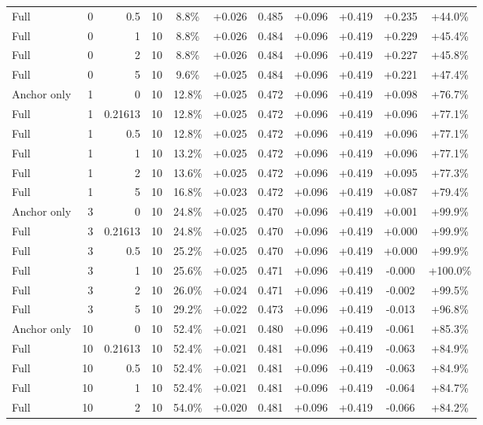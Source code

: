 \begin{table}[htbp]
\begin{tabular}{lrrrccccccc}
Full & 0 & 0.5 & 10 & 8.8\% & +0.026 & 0.485 & +0.096 & +0.419 & +0.235 & +44.0\% \\
Full & 0 & 1 & 10 & 8.8\% & +0.026 & 0.484 & +0.096 & +0.419 & +0.229 & +45.4\% \\
Full & 0 & 2 & 10 & 8.8\% & +0.026 & 0.484 & +0.096 & +0.419 & +0.227 & +45.8\% \\
Full & 0 & 5 & 10 & 9.6\% & +0.025 & 0.484 & +0.096 & +0.419 & +0.221 & +47.4\% \\
Anchor only & 1 & 0 & 10 & 12.8\% & +0.025 & 0.472 & +0.096 & +0.419 & +0.098 & +76.7\% \\
Full & 1 & 0.21613 & 10 & 12.8\% & +0.025 & 0.472 & +0.096 & +0.419 & +0.096 & +77.1\% \\
Full & 1 & 0.5 & 10 & 12.8\% & +0.025 & 0.472 & +0.096 & +0.419 & +0.096 & +77.1\% \\
Full & 1 & 1 & 10 & 13.2\% & +0.025 & 0.472 & +0.096 & +0.419 & +0.096 & +77.1\% \\
Full & 1 & 2 & 10 & 13.6\% & +0.025 & 0.472 & +0.096 & +0.419 & +0.095 & +77.3\% \\
Full & 1 & 5 & 10 & 16.8\% & +0.023 & 0.472 & +0.096 & +0.419 & +0.087 & +79.4\% \\
Anchor only & 3 & 0 & 10 & 24.8\% & +0.025 & 0.470 & +0.096 & +0.419 & +0.001 & +99.9\% \\
Full & 3 & 0.21613 & 10 & 24.8\% & +0.025 & 0.470 & +0.096 & +0.419 & +0.000 & +99.9\% \\
Full & 3 & 0.5 & 10 & 25.2\% & +0.025 & 0.470 & +0.096 & +0.419 & +0.000 & +99.9\% \\
Full & 3 & 1 & 10 & 25.6\% & +0.025 & 0.471 & +0.096 & +0.419 & -0.000 & +100.0\% \\
Full & 3 & 2 & 10 & 26.0\% & +0.024 & 0.471 & +0.096 & +0.419 & -0.002 & +99.5\% \\
Full & 3 & 5 & 10 & 29.2\% & +0.022 & 0.473 & +0.096 & +0.419 & -0.013 & +96.8\% \\
Anchor only & 10 & 0 & 10 & 52.4\% & +0.021 & 0.480 & +0.096 & +0.419 & -0.061 & +85.3\% \\
Full & 10 & 0.21613 & 10 & 52.4\% & +0.021 & 0.481 & +0.096 & +0.419 & -0.063 & +84.9\% \\
Full & 10 & 0.5 & 10 & 52.4\% & +0.021 & 0.481 & +0.096 & +0.419 & -0.063 & +84.9\% \\
Full & 10 & 1 & 10 & 52.4\% & +0.021 & 0.481 & +0.096 & +0.419 & -0.064 & +84.7\% \\
Full & 10 & 2 & 10 & 54.0\% & +0.020 & 0.481 & +0.096 & +0.419 & -0.066 & +84.2\% \\

\end{tabular}
\end{table}
